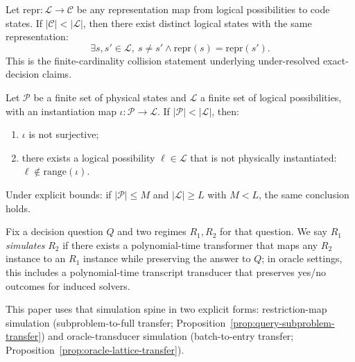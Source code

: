 \begin{proposition}\label{prop:under-resolution-collision}
Let \(\mathrm{repr} : \mathcal{L} \to \mathcal{C}\) be any representation map from logical possibilities to code states. If \(|\mathcal{C}| < |\mathcal{L}|\), then there exist distinct logical states with the same representation:
\[
\exists s,s' \in \mathcal{L},\ s \neq s' \wedge \mathrm{repr}(s)=\mathrm{repr}(s').
\]
This is the finite-cardinality collision statement underlying under-resolved exact-decision claims.
\end{proposition}

\begin{theorem}\label{thm:physical-incompleteness}
Let $\mathcal{P}$ be a finite set of physical states and $\mathcal{L}$ a finite set of logical possibilities, with an instantiation map $\iota : \mathcal{P} \to \mathcal{L}$. If $|\mathcal{P}| < |\mathcal{L}|$, then:
\begin{enumerate}
\item $\iota$ is not surjective;
\item there exists a logical possibility $\ell \in \mathcal{L}$ that is not physically instantiated: $\ell \notin \mathrm{range}(\iota)$.
\end{enumerate}
Under explicit bounds: if $|\mathcal{P}| \le M$ and $|\mathcal{L}| \ge L$ with $M < L$, the same conclusion holds.
\end{theorem}

\begin{definition}\label{def:regime-simulation}
Fix a decision question $Q$ and two regimes $R_1,R_2$ for that question.
We say $R_1$ \emph{simulates} $R_2$ if there exists a polynomial-time transformer that maps any $R_2$ instance to an $R_1$ instance while preserving the answer to $Q$; in oracle settings, this includes a polynomial-time transcript transducer that preserves yes/no outcomes for induced solvers.
\end{definition}

This paper uses that simulation spine in two explicit forms: restriction-map simulation (subproblem-to-full transfer; Proposition~\ref{prop:query-subproblem-transfer}) and oracle-transducer simulation (batch-to-entry transfer; Proposition~\ref{prop:oracle-lattice-transfer}).

